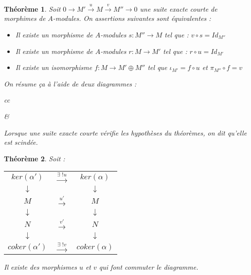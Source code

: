 \documentclass{article}           %
\let\dummy\exists						%
\renewcommand*{\exists}{\dummy \,}
\newcommand\SEC[5]{
0 {\longrightarrow} 
{#1} \overset{{#4}}{\longrightarrow} 
{#2} \overset{{#5}}{\longrightarrow} 
{#3} {\longrightarrow} 
0}
\theoremstyle{break}
\theoremstyle{add}
\theoremstyle{break} %
\newtheorem{theoreme}{Théorème}[section]
\theoremstyle{add}
\begin{document}
\begin{theoreme}
Soit $\SEC{M'}{M}{M''}{u}{v}$ une suite exacte courte de morphimes de $A$-modules. On assertions suivantes sont équivalentes :
\begin{itemize}
\item Il existe un morphisme de $A$-modules $s : M'' \longrightarrow M$ tel que : $v \circ s = Id_{M''}$
\item Il existe un morphisme de $A$-modules $r : M \longrightarrow M'$ tel que : $r \circ u = Id_{M'}$
\item Il existe un isomorphisme $f : M \longrightarrow M' \oplus M''$ tel que $ \iota_{M'} = f \circ u$ et $\pi_{M''} \circ f = v$
\end{itemize}
On résume ça à l'aide de deux diagrammes : \\

\begin{tabular}{cc}
 &
\end{tabular}

Lorsque une suite exacte courte vérifie les hypothèses du théorèmes, on dit qu'elle est \textit{scindée}. \\
\end{theoreme}


\begin{theoreme}
Soit : \\

\begin{tabular}{ccc}
$ker(\alpha')$ & $\overset{\exists ! u}{\longrightarrow}$ & $ker(\alpha)$ \\
$\downarrow$ && $\downarrow$ \\
$M$ & $\overset{u'}{\longrightarrow}$ & $M$ \\
$\downarrow$ && $\downarrow$ \\
$N$ & $\overset{v'}{\longrightarrow}$ & $N$ \\
$\downarrow$ && $\downarrow$ \\
$coker(\alpha')$ & $\overset{\exists ! v}{\longrightarrow}$ & $coker(\alpha)$ \\
\end{tabular}

Il existe des morphismes $u$ et $v$ qui font commuter le diagramme. \\
\end{theoreme}
\end{document}
